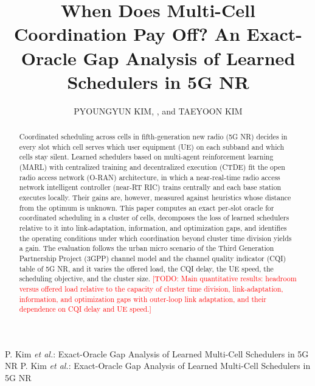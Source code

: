 \documentclass{ieeeaccess}
\newcommand{\todo}[1]{\textcolor{red}{[TODO: #1]}}
\begin{document}

\title{When Does Multi-Cell Coordination Pay Off? An Exact-Oracle Gap Analysis of Learned Schedulers in 5G NR}
\author{\uppercase{Pyoungyun Kim}, , and \uppercase{Taeyoon Kim}}
\address[1]{Korea University, 145 Anam-ro, Seongbuk-gu, Seoul 02841, Republic of Korea}
\address[2]{Visual Display Division, Samsung Electronics, Republic of Korea}
\address[3]{School of Mobile System Engineering, Dankook University, Yongin 16890, Republic of Korea}

\markboth
{P. Kim \emph{et al.}: Exact-Oracle Gap Analysis of Learned Multi-Cell Schedulers in 5G NR}
{P. Kim \emph{et al.}: Exact-Oracle Gap Analysis of Learned Multi-Cell Schedulers in 5G NR}


\begin{abstract}
Coordinated scheduling across cells in fifth-generation new radio (5G NR) decides in every slot which cell serves which user equipment (UE) on each subband and which cells stay silent. Learned schedulers based on multi-agent reinforcement learning (MARL) with centralized training and decentralized execution (CTDE) fit the open radio access network (O-RAN) architecture, in which a near-real-time radio access network intelligent controller (near-RT RIC) trains centrally and each base station executes locally. Their gains are, however, measured against heuristics whose distance from the optimum is unknown. This paper computes an exact per-slot oracle for coordinated scheduling in a cluster of cells, decomposes the loss of learned schedulers relative to it into link-adaptation, information, and optimization gaps, and identifies the operating conditions under which coordination beyond cluster time division yields a gain. The evaluation follows the urban micro scenario of the Third Generation Partnership Project (3GPP) channel model and the channel quality indicator (CQI) table of 5G NR, and it varies the offered load, the CQI delay, the UE speed, the scheduling objective, and the cluster size. \todo{Main quantitative results: headroom versus offered load relative to the capacity of cluster time division, link-adaptation, information, and optimization gaps with outer-loop link adaptation, and their dependence on CQI delay and UE speed.}
\end{abstract}
\end{document}
